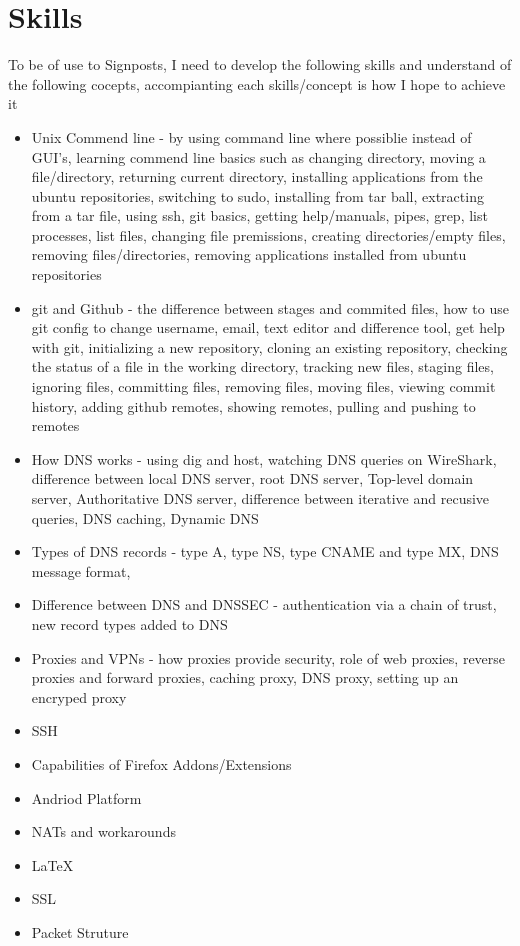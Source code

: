 \documentclass[12pt,a4paper,oneside]{article}
\begin{document}
\section{Skills}
To be of use to Signposts, I need to develop the following skills and understand of the following cocepts, accompianting each skills/concept is how I hope to achieve it
\begin{itemize}
\item Unix Commend line - by using command line where possiblie instead of GUI's, learning commend line basics such as changing directory, moving a file/directory, returning current directory, installing applications from the ubuntu repositories, switching to sudo, installing from tar ball, extracting from a tar file, using ssh, git basics, getting help/manuals, pipes, grep, list processes, list files, changing file premissions, creating directories/empty files, removing files/directories, removing applications installed from ubuntu repositories
\item git and Github - the difference between stages and commited files, how to use git config to change username, email, text editor and difference tool, get help with git, initializing a new repository, cloning an existing repository, checking the status of a file in the working directory, tracking new files, staging files, ignoring files, committing files, removing files, moving files, viewing commit history, adding github remotes, showing remotes, pulling and pushing to remotes
\item How DNS works - using dig and host, watching DNS queries on WireShark, difference between local DNS server, root DNS server, Top-level domain server, Authoritative DNS server, difference between iterative and recusive queries, DNS caching, Dynamic DNS
\item Types of DNS records - type A, type NS, type CNAME and type MX, DNS message format, 
\item Difference between DNS and DNSSEC - authentication via a chain of trust, new record types added to DNS
\item Proxies and VPNs - how proxies provide security, role of web proxies, reverse proxies and forward proxies, caching proxy, DNS proxy, setting up an encryped proxy 
\item SSH
\item Capabilities of Firefox Addons/Extensions
\item Andriod Platform
\item NATs and workarounds
\item LaTeX
\item SSL 
\item Packet Struture 
\end{itemize}
\end{document}
